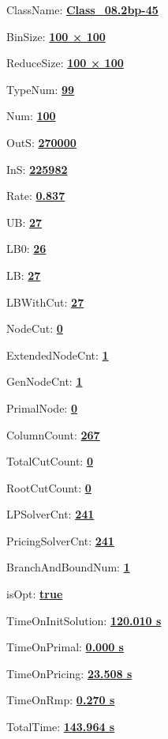 \documentclass[11pt]{article}
\begin{document}
\pagestyle{empty}


ClassName: \underline{\textbf{Class_08.2bp-45}}
\par
BinSize: \underline{\textbf{100 × 100}}
\par
ReduceSize: \underline{\textbf{100 × 100}}
\par
TypeNum: \underline{\textbf{99}}
\par
Num: \underline{\textbf{100}}
\par
OutS: \underline{\textbf{270000}}
\par
InS: \underline{\textbf{225982}}
\par
Rate: \underline{\textbf{0.837}}
\par
UB: \underline{\textbf{27}}
\par
LB0: \underline{\textbf{26}}
\par
LB: \underline{\textbf{27}}
\par
LBWithCut: \underline{\textbf{27}}
\par
NodeCut: \underline{\textbf{0}}
\par
ExtendedNodeCnt: \underline{\textbf{1}}
\par
GenNodeCnt: \underline{\textbf{1}}
\par
PrimalNode: \underline{\textbf{0}}
\par
ColumnCount: \underline{\textbf{267}}
\par
TotalCutCount: \underline{\textbf{0}}
\par
RootCutCount: \underline{\textbf{0}}
\par
LPSolverCnt: \underline{\textbf{241}}
\par
PricingSolverCnt: \underline{\textbf{241}}
\par
BranchAndBoundNum: \underline{\textbf{1}}
\par
isOpt: \underline{\textbf{true}}
\par
TimeOnInitSolution: \underline{\textbf{120.010 s}}
\par
TimeOnPrimal: \underline{\textbf{0.000 s}}
\par
TimeOnPricing: \underline{\textbf{23.508 s}}
\par
TimeOnRmp: \underline{\textbf{0.270 s}}
\par
TotalTime: \underline{\textbf{143.964 s}}
\par
\newpage


\end{document}
